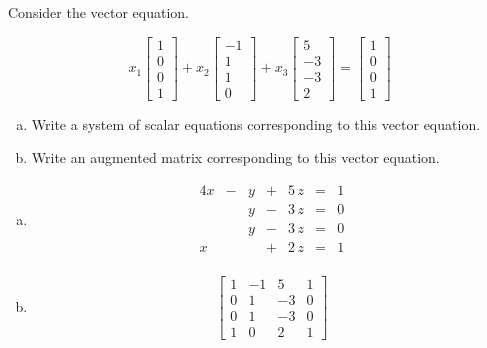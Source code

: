 
\begin{exerciseStatement}


Consider the vector equation.

\[ x_{1} \left[\begin{array}{c}
1 \\
0 \\
0 \\
1
\end{array}\right] + x_{2} \left[\begin{array}{c}
-1 \\
1 \\
1 \\
0
\end{array}\right] + x_{3} \left[\begin{array}{c}
5 \\
-3 \\
-3 \\
2
\end{array}\right] = \left[\begin{array}{c}
1 \\
0 \\
0 \\
1
\end{array}\right] \]
\begin{enumerate}[(a)]
\item  Write a system of scalar equations corresponding to this vector equation. 
\item  Write an augmented matrix corresponding to this vector equation. 
\end{enumerate}
    
\end{exerciseStatement}
    
\begin{exerciseAnswer} 

\begin{enumerate}[(a)]
\item 
\begin{alignat*}{4} x &-& y &+& 5 \, z &=& 1 \\ & & y &-& 3 \, z &=& 0 \\ & & y &-& 3 \, z &=& 0 \\x & &  &+& 2 \, z &=& 1 \\ \end{alignat*}
            
\item \[ \left[\begin{array}{ccc|c}
1 & -1 & 5 & 1 \\
0 & 1 & -3 & 0 \\
0 & 1 & -3 & 0 \\
1 & 0 & 2 & 1
\end{array}\right] \]
\end{enumerate}
    
\end{exerciseAnswer}
    
